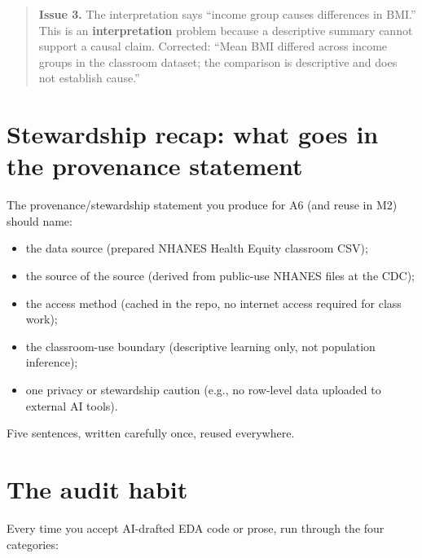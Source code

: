 \documentclass[
  letterpaper,
  DIV=11,
  numbers=noendperiod,
  oneside]{scrreprt}
\providecommand{\tightlist}{%
  \setlength{\itemsep}{0pt}\setlength{\parskip}{0pt}}
\begin{document}

\begin{quote}
\textbf{Issue 3.} The interpretation says ``income group causes
differences in BMI.'' This is an \textbf{interpretation} problem because
a descriptive summary cannot support a causal claim. Corrected: ``Mean
BMI differed across income groups in the classroom dataset; the
comparison is descriptive and does not establish cause.''
\end{quote}

\section*{Stewardship recap: what goes in the provenance
statement}\label{stewardship-recap-what-goes-in-the-provenance-statement}


The provenance/stewardship statement you produce for A6 (and reuse in
M2) should name:

\begin{itemize}
\tightlist
\item
  the data source (prepared NHANES Health Equity classroom CSV);
\item
  the source of the source (derived from public-use NHANES files at the
  CDC);
\item
  the access method (cached in the repo, no internet access required for
  class work);
\item
  the classroom-use boundary (descriptive learning only, not population
  inference);
\item
  one privacy or stewardship caution (e.g., no row-level data uploaded
  to external AI tools).
\end{itemize}

Five sentences, written carefully once, reused everywhere.

\section*{The audit habit}\label{the-audit-habit}


Every time you accept AI-drafted EDA code or prose, run through the four
categories:
\end{document}
